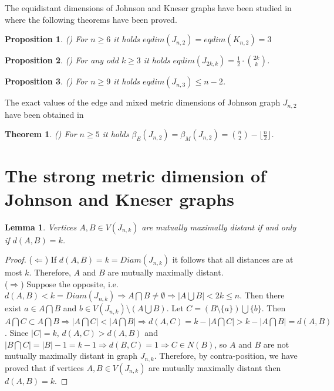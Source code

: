 \documentclass[preprint,12pt]{elsarticle}
\newtheorem{lem}{Lemma}
\newtheorem{thm}{Theorem}
\newtheorem{pro}{Proposition}
\begin{document}
The equidistant dimensions of Johnson and Kneser graphs have been studied
in \cite{eqdj} where the following theorems have been proved.

\begin{pro} \mbox{\rm(\cite{eqdj})} For $n \ge 6$ it holds $eqdim(J_{n,2}) = eqdim(K_{n,2}) = 3$ \end{pro}

\begin{pro} \mbox{\rm(\cite{eqdj})} For any odd $k \ge 3$ it holds $eqdim(J_{2k,k}) = \frac{1}{2} \cdot \binom{2k}{k}$. 
 \end{pro}

\begin{pro} \mbox{\rm(\cite{eqdj})} For $n \ge 9$ it holds  $eqdim(J_{n,3}) \le n-2$. 
 \end{pro} 

The exact values of the edge and mixed metric dimensions of Johnson graph $J_{n,2}$
have been obtained in \cite{emetdj} 

\begin{thm} \label{edj} \mbox{\rm(\cite{emetdj})} For $n \ge 5$ it holds $\beta_E(J_{n,2}) =  \beta_M(J_{n,2}) = \binom{n}{2} - \lfloor \frac{n}{2} \rfloor$.
 \end{thm} 


\section{The strong metric dimension of Johnson and Kneser graphs}

\begin{lem} \label{sdimjl} Vertices $A,B \in V(J_{n,k})$ are mutually maximally distant if and only if $d(A,B) = k$.\end{lem}
\begin{proof}
($\Leftarrow$) If $d(A,B) = k = Diam(J_{n,k})$ it follows that all distances are at most $k$. Therefore,
$A$ and $B$ are mutually maximally distant. \\
($\Rightarrow$) Suppose the opposite, i.e. $d(A,B) < k = Diam(J_{n,k}) \Rightarrow A \bigcap B \ne \emptyset \Rightarrow
|A \bigcup B| < 2k \le n$. 
Then there exist $a \in A \bigcap B$ and $b \in V(J_{n,k}) \setminus (A \bigcup B)$. Let $C = (B \setminus \{a\}) \bigcup \{b\}$.
Then $A \bigcap C \subset A \bigcap B \Rightarrow |A \bigcap C| < |A \bigcap B| \Rightarrow d(A,C) = k - |A \bigcap C| > k - |A \bigcap B|
= d(A,B)$. Since $|C|=k$, $d(A,C) > d(A,B)$ and $|B \bigcap C| = |B|-1 = k-1 \Rightarrow d(B,C)=1 \Rightarrow C \in N(B)$,
so $A$ and $B$ are not mutually maximally distant in graph $J_{n,k}$.
Therefore, by contra-position, we have proved that if vertices $A,B \in V(J_{n,k})$ are mutually maximally distant then $d(A,B) = k$.
\end{proof}
\end{document}
